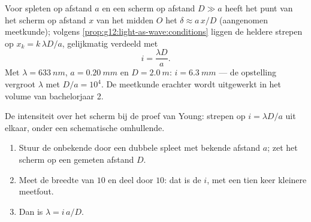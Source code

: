 \begin{proposition}[De strepenafstand]\label{prop:g12:light-as-wave:interfringe}
Voor spleten op afstand $a$ en een scherm op afstand $D \gg a$ heeft het
punt van het scherm op afstand $x$ van het midden $O$ het
 $\delta \approx a\,x/D$ (aangenomen meetkunde); volgens
\cref{prop:g12:light-as-wave:conditions} liggen de heldere strepen op
$x_k = k\,\lambda D/a$, gelijkmatig verdeeld met 
\[
i = \frac{\lambda D}{a}.
\]
Met $\lambda = \qty{633}{nm}$, $a = \qty{0.20}{mm}$ en
$D = \qty{2.0}{m}$: $i = \qty{6.3}{mm}$ --- de opstelling vergroot
$\lambda$ met $D/a = 10^4$. De meetkunde erachter wordt uitgewerkt in het
volume van bachelorjaar 2.
\end{proposition}
\admitted

\begin{omfigure}

{\small De intensiteit over het scherm bij de proef van Young: strepen op
$i = \lambda D/a$ uit elkaar, onder een schematische omhullende.}
\end{omfigure}

\begin{method}\label{met:g12:light-as-wave:lambda}
\begin{enumerate}
  \item Stuur de onbekende  door een dubbele spleet met bekende
        afstand $a$; zet het scherm op een gemeten afstand $D$.
  \item Meet de breedte van $10$  en deel door $10$: dat
        is de  $i$, met een tien keer kleinere meetfout.
  \item Dan is $\lambda = i\,a/D$.
\end{enumerate}
\end{method}

